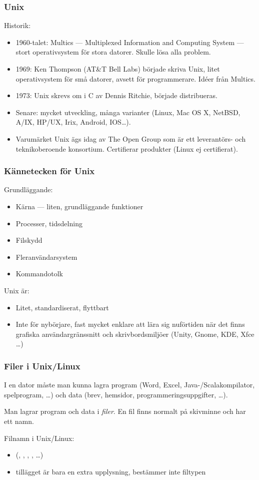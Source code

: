 \begin{frame}[fragile=singleslide]
\frametitle{Unix}
Historik:

\begin{itemize}
\item 1960-talet: Multics --- Multiplexed Information and Computing System --- stort operativsystem för stora datorer. Skulle lösa alla problem.
\item 1969: Ken Thompson (AT\&T Bell Labs) började skriva Unix, litet operativsystem för små datorer, avsett för programmerare. Idéer från Multics.
\item 1973: Unix skrevs om i C av Dennis Ritchie, började distribueras.
\item Senare: mycket utveckling, många varianter (Linux, Mac OS X, NetBSD, A/IX, HP/UX, Irix, Android, IOS\ldots).
\item Varumärket Unix ägs idag av The Open Group som är ett leverantörs- och teknikoberoende konsortium. Certifierar produkter (Linux ej certifierat).
\end{itemize}
\end{frame} 

\begin{frame}[fragile=singleslide]
\frametitle{Kännetecken för Unix}
Grundläggande:
\begin{itemize}
\item Kärna --- liten, grundläggande funktioner
\item Processer, tidsdelning
\item Filskydd
\item Fleranvändarsystem
\item Kommandotolk
\end{itemize}
Unix är:
\begin{itemize}
\item Litet, standardiserat, flyttbart
\item Inte för nybörjare, fast mycket enklare att lära sig nuförtiden när det finns grafiska användargränssnitt och skrivbordsmiljöer (Unity, Gnome, KDE, Xfce \ldots)
\end{itemize}
\end{frame} 

\begin{frame}[fragile=singleslide]
\frametitle{Filer i Unix/Linux}
I en dator måste man kunna lagra program (Word, Excel, Java-/Scalakompilator, spelprogram, \ldots) och data (brev, hemsidor, programmeringsuppgifter, \ldots).

\pindent Man lagrar program och data i \emph{filer}. En fil finns normalt på skivminne och har ett namn.

\pindent Filnamn i Unix/Linux:

\begin{itemize}
\item {} (, , , , \ldots)
\item tillägget är bara en extra upplysning, bestämmer inte filtypen
\end{itemize}
\end{frame} 

